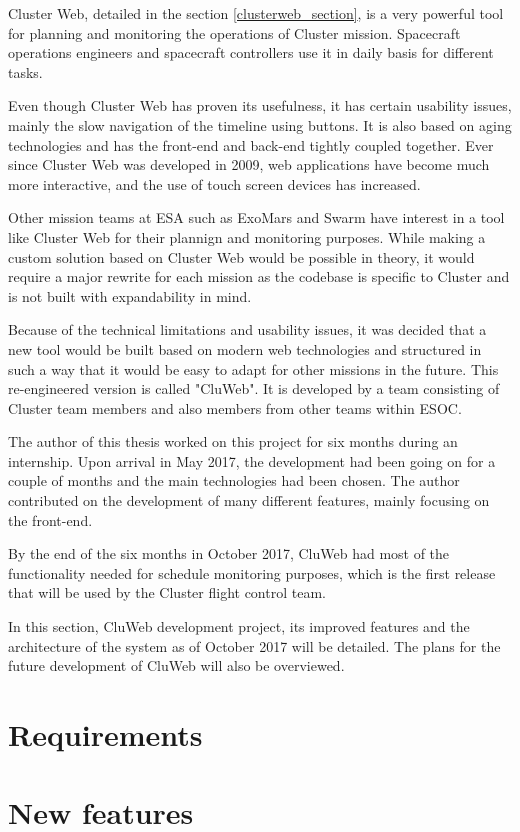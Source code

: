 Cluster Web, detailed in the section \ref{clusterweb_section}, is a very powerful tool for planning and monitoring the operations of Cluster mission. Spacecraft operations engineers and spacecraft controllers use it in daily basis for different tasks.

Even though Cluster Web has proven its usefulness, it has certain usability issues, mainly the slow navigation of the timeline using buttons. It is also based on aging technologies and has the front-end and back-end tightly coupled together. Ever since Cluster Web was developed in 2009, web applications have become much more interactive, and the use of touch screen devices has increased.

Other mission teams at ESA such as ExoMars and Swarm have interest in a tool like Cluster Web for their plannign and monitoring purposes. While making a custom solution based on Cluster Web would be possible in theory, it would require a major rewrite for each mission as the codebase is specific to Cluster and is not built with expandability in mind.

Because of the technical limitations and usability issues, it was decided that a new tool would be built based on modern web technologies and structured in such a way that it would be easy to adapt for other missions in the future. This re-engineered version is called "CluWeb". It is developed by a team consisting of Cluster team members and also members from other teams within ESOC.

The author of this thesis worked on this project for six months during an internship. Upon arrival in May 2017, the development had been going on for a couple of months and the main technologies had been chosen. The author contributed on the development of many different features, mainly focusing on the front-end. 

By the end of the six months in October 2017, CluWeb had most of the functionality needed for schedule monitoring purposes, which is the first release that will be used by the Cluster flight control team.

In this section, CluWeb development project, its improved features and the architecture of the system as of October 2017 will be detailed. The plans for the future development of CluWeb will also be overviewed.

\section{Requirements}
\section{New features}
